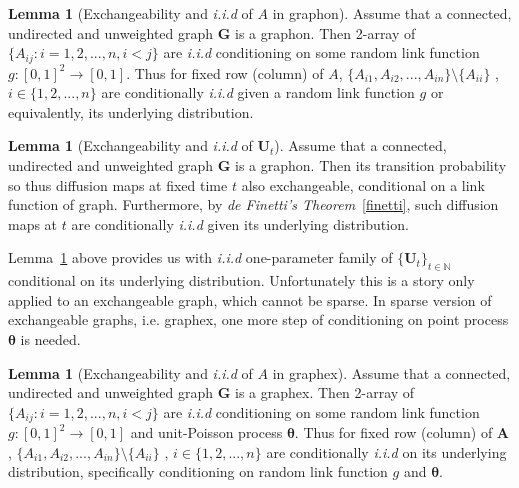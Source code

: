 \documentclass[12pt]{article}
\theoremstyle{definition}
\newtheorem{lemma}[theorem]{Lemma}
\begin{document}
\begin{lemma}[Exchangeability and \textit{i.i.d} of $A$ in graphon]
	\label{lemma_graphon}
Assume that a connected, undirected and unweighted graph $\mathbf{G}$ is a graphon. Then 2-array of $\{ A_{ij} : i = 1,2,... ,n , i < j \}$ are  \textit{i.i.d} conditioning on some random link function $g : [0,1]^2 \rightarrow [0,1]$. Thus for fixed row (column) of $A$, $\{ A_{i1}, A_{i2}, ... , A_{in} \} \setminus \{ A_{ii} \} $ , $i \in \{ 1,2,... , n \}$ are conditionally \textit{i.i.d} given a random link function $g$ or equivalently, its underlying distribution.  
\end{lemma}
	
\begin{lemma}[Exchangeability and \textit{i.i.d} of $\mathbf{U}_{t}$]
\label{main_lemma}
	Assume that a connected, undirected and unweighted graph $\mathbf{G}$ is a graphon. Then its transition probability so thus diffusion maps at fixed time $t$ also exchangeable, conditional on a link function of graph. Furthermore, by \textit{de Finetti's Theorem}~\ref{finetti}, such diffusion maps at $t$ are conditionally \textit{i.i.d} given its underlying distribution.    
\end{lemma}
	
Lemma~\ref{main_lemma} above provides us with \textit{i.i.d} one-parameter family of $\{ \mathbf{U}_{t} \}_{t \in \mathbb{N}}$ conditional on its underlying distribution. Unfortunately this is a story only applied to an exchangeable graph, which cannot be sparse. In sparse version of exchangeable graphs, i.e. graphex, one more step of conditioning on point process $\mathbf{\theta}$ is needed.  
	
\begin{lemma}[Exchangeability and \textit{i.i.d} of $A$ in graphex]
\label{lemma_graphex}
Assume that a connected, undirected and unweighted graph $\mathbf{G}$ is a graphex. Then 2-array of $\{ A_{ij} : i = 1,2,... ,n , i < j \}$ are  \textit{i.i.d} conditioning on some random link function $g : [0,1]^2 \rightarrow [0,1]$ and unit-Poisson process $\mathbf{\theta}$. Thus for fixed row (column) of $\mathbf{A}$, $\{ A_{i1}, A_{i2}, ... , A_{in} \} \setminus \{ A_{ii} \} $ , $i \in \{ 1,2,... , n \}$ are conditionally \textit{i.i.d} on its underlying distribution, specifically conditioning on random link function $g$ and $\mathbf{\theta}$.  
\end{lemma}	
\end{document}
